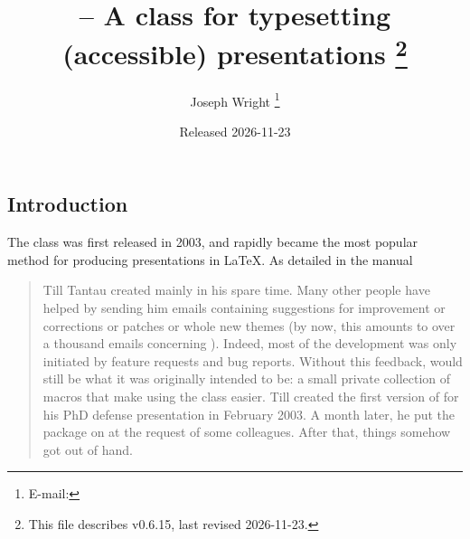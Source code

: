\documentclass{l3doc}
\makeatletter
\let\acro\@firstofone
\def\filedate{2026-11-23}
\def\fileversion{v0.6.15}
\makeatother
\begin{document}
\title{%
   -- A class for typesetting (accessible) presentations%
  \thanks{This file describes \fileversion,
    last revised \filedate.}%
}

\author{%
  Joseph Wright%
  \thanks{%
    E-mail: %
  }%
}

\date{Released \filedate}

\maketitle

\tableofcontents

\begin{documentation}

\section{Introduction%
  \label{sec:intro}}

The  class was first released in 2003, and rapidly became the
most popular method for producing presentations in \LaTeX{}. As detailed in
the  manual
\begin{quotation}
  Till Tantau created  mainly in his spare time. Many other people
  have helped by sending him emails containing suggestions for improvement or
  corrections or patches or whole new themes (by now, this amounts to over a
  thousand emails concerning ). Indeed, most of the development was
  only initiated by feature requests and bug reports. Without this feedback,
   would still be what it was originally intended to be: a small
  private collection of macros that make using the  class easier.
  Till created the first version of  for his PhD defense
  presentation in February 2003. A month later, he put the package on
  \acro{ctan} at the request of some colleagues. After that, things somehow got
  out of hand.
\end{quotation}


\end{documentation}
\end{document}
